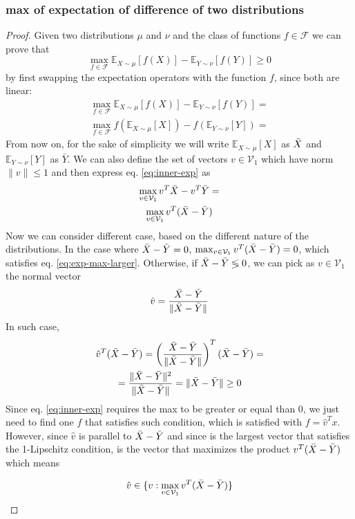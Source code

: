 \documentclass[12pt]{article}
\begin{document}
\subsubsection{max of expectation of difference of two distributions}
\begin{proof}
Given two distributions $\mu$ and $\nu$ and the class of functions $f \in \mathcal{F}$ we can prove that 
\begin{equation} \label{eq:exp-max-larger}
    \max_{f \in \mathcal{F}} \mathbb{E}_{X \sim \mu} [f(X)] -  \mathbb{E}_{Y \sim \nu} [f(Y)] \geq 0
\end{equation} \label{eq:expectation-ineq}
by first swapping the expectation operators with the function $f$, since both are linear:
\begin{gather}
    \max_{f \in \mathcal{F}} \mathbb{E}_{X \sim \mu} [f(X)] -  \mathbb{E}_{Y \sim \nu} [f(Y)] = \\
    \max_{f \in \mathcal{F}} f(\mathbb{E}_{X \sim \mu} [X]) -  f(\mathbb{E}_{Y \sim \nu} [Y]) = \label{eq:inner-exp}
\end{gather}
From now on, for the sake of simplicity we will write $\mathbb{E}_{X \sim \mu} [X]$ as $\Bar{X}$ and $\mathbb{E}_{Y \sim \nu} [Y]$ as $\bar{Y}$. We can also define the set of vectors $v \in \mathcal{V}_{1}$ which have norm $\lVert v \rVert \leq 1$ and then express eq. \eqref{eq:inner-exp} as
\begin{gather}
    \max_{v \in \mathcal{V}_1} v^{T}\Bar{X} -  v^{T}\Bar{Y} = \\
    \max_{v \in \mathcal{V}_1} v^{T}(\Bar{X} - \Bar{Y}) \label{eq:momentum-difference}
\end{gather}
Now we can consider different case, based on the different nature of the distributions. In the case where $\Bar{X} - \Bar{Y} = 0$, $\max_{v \in \mathcal{V}_1} v^{T}(\Bar{X} - \Bar{Y}) = 0$, which satisfies eq. \eqref{eq:exp-max-larger}. Otherwise, if $\Bar{X} - \Bar{Y} \lessgtr 0$, we can pick as $v \in \mathcal{V}_1$ the normal vector
\begin{equation} \label{eq:v}
    \hat{v} = \frac{\Bar{X} - \Bar{Y}}{\lVert \Bar{X} - \Bar{Y} \rVert}
\end{equation}
In such case,
\begin{gather}
    \hat{v}^{T}(\Bar{X} - \Bar{Y}) =
    \left ( \frac{\Bar{X} - \Bar{Y}}{\lVert \Bar{X} - \Bar{Y} \rVert} \right ) ^{T}(\Bar{X} - \Bar{Y}) = \\
    = \frac{\lVert \Bar{X} - \Bar{Y} \rVert ^{2}}{\lVert \Bar{X} - \Bar{Y} \rVert} = \lVert \Bar{X} - \Bar{Y} \rVert \geq 0
\end{gather}
Since eq. \eqref{eq:inner-exp} requires the max to be greater or equal than 0, we just need to find one $f$ that satisfies such condition, which is satisfied with $f = \hat{v}^{T}x$. However, since $\hat{v}$ is parallel to $\Bar{X} - \Bar{Y}$ and since is the largest vector that satisfies the 1-Lipschitz condition, is the vector that maximizes the product $v^{T}(\Bar{X} - \Bar{Y})$ which means

\begin{equation}
    \hat{v} \in \{v : \max_{v \in \mathcal{V}_1} v^{T}(\Bar{X} - \Bar{Y})\}
\end{equation}
\end{proof}
\end{document}
